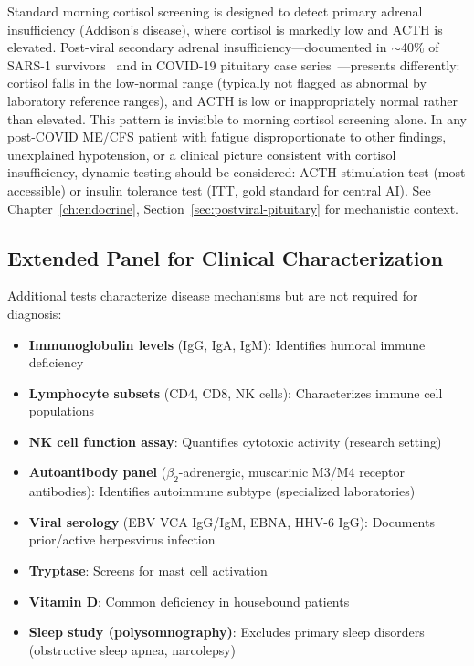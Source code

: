 \begin{warning}
Standard morning cortisol screening is designed to detect primary adrenal insufficiency (Addison's disease), where cortisol is markedly low and ACTH is elevated. Post-viral secondary adrenal insufficiency---documented in $\sim$40\% of SARS-1 survivors~\cite{Leow2005sars} and in COVID-19 pituitary case series~\cite{Carosi2024hypopituitarism}---presents differently: cortisol falls in the low-normal range (typically not flagged as abnormal by laboratory reference ranges), and ACTH is low or inappropriately normal rather than elevated. This pattern is invisible to morning cortisol screening alone. In any post-COVID ME/CFS patient with fatigue disproportionate to other findings, unexplained hypotension, or a clinical picture consistent with cortisol insufficiency, dynamic testing should be considered: ACTH stimulation test (most accessible) or insulin tolerance test (ITT, gold standard for central AI). See Chapter~\ref{ch:endocrine}, Section~\ref{sec:postviral-pituitary} for mechanistic context.
\end{warning}

\subsection{Extended Panel for Clinical Characterization}

Additional tests characterize disease mechanisms but are not required for diagnosis:

\begin{itemize}
    \item \textbf{Immunoglobulin levels} (IgG, IgA, IgM): Identifies humoral immune deficiency
    \item \textbf{Lymphocyte subsets} (CD4, CD8, NK cells): Characterizes immune cell populations
    \item \textbf{NK cell function assay}: Quantifies cytotoxic activity (research setting)
    \item \textbf{Autoantibody panel} ($\beta_2$-adrenergic, muscarinic M3/M4 receptor antibodies): Identifies autoimmune subtype (specialized laboratories)
    \item \textbf{Viral serology} (EBV VCA IgG/IgM, EBNA, HHV-6 IgG): Documents prior/active herpesvirus infection
    \item \textbf{Tryptase}: Screens for mast cell activation
    \item \textbf{Vitamin D}: Common deficiency in housebound patients
    \item \textbf{Sleep study (polysomnography)}: Excludes primary sleep disorders (obstructive sleep apnea, narcolepsy)
\end{itemize}

